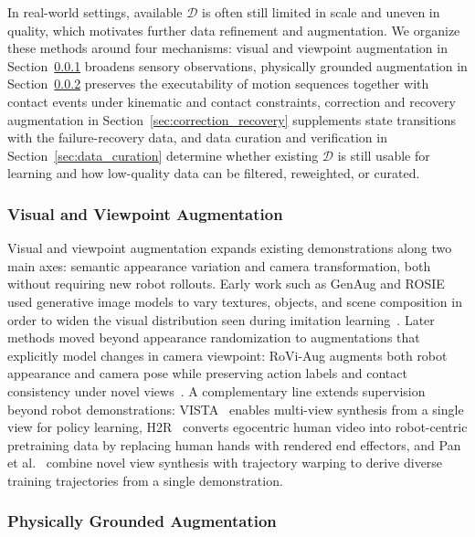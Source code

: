 \documentclass[acmsmall,screen,review]{acmart}
\begin{document}
In real-world settings, available \(\mathcal{D}\) is often still limited in scale and uneven in quality, which motivates further data refinement and augmentation. 
We organize these methods around four mechanisms: visual and viewpoint augmentation in Section~\ref{sec:trajectory_redrawing} broadens sensory observations, 
physically grounded augmentation in Section~\ref{sec:dynamics_constraints} preserves the executability of motion sequences together with contact events under kinematic and contact constraints, 
correction and recovery augmentation in Section~\ref{sec:correction_recovery} supplements state transitions with the failure-recovery data, 
and data curation and verification in Section~\ref{sec:data_curation} determine whether existing \(\mathcal{D}\) is still usable for learning and how low-quality data can be filtered, reweighted, or curated. 

\subsubsection{Visual and Viewpoint Augmentation}\label{sec:trajectory_redrawing}

Visual and viewpoint augmentation expands existing demonstrations along two main axes: semantic appearance variation and camera transformation, both without requiring new robot rollouts. 
Early work such as GenAug and ROSIE used generative image models to vary textures, objects, and scene composition in order to widen the visual distribution seen during imitation learning~\cite{chen2023genaug, yu2023scalingrobotlearningsemantically}. 
Later methods moved beyond appearance randomization to augmentations that explicitly model changes in camera viewpoint: RoVi-Aug augments both robot appearance and camera pose while preserving action labels and contact consistency under novel views~\cite{chen2025roviaug}. 
A complementary line extends supervision beyond robot demonstrations: VISTA~\cite{wang2024vista} enables multi-view synthesis from a single view for policy learning, H2R~\cite{li2025h2r} converts egocentric human video into robot-centric pretraining data by replacing human hands with rendered end effectors, and Pan et al.~\cite{pan2025one} combine novel view synthesis with trajectory warping to derive diverse training trajectories from a single demonstration.

\subsubsection{Physically Grounded Augmentation}\label{sec:dynamics_constraints}
\end{document}
